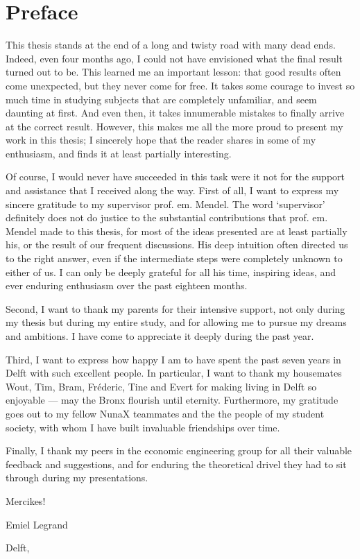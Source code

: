 \chapter{Preface}
\thispagestyle{empty}
This thesis stands at the end of a long and twisty road with many dead ends. Indeed, even four months ago, I could not have envisioned what the final result turned out to be. This learned me an important lesson: that good results often come unexpected, but they never come for free. It takes some courage to invest so much time in studying subjects that are completely unfamiliar, and seem daunting at first. And even then, it takes innumerable mistakes to finally arrive at the correct result. 
However, this makes me all the more proud to present my work in this thesis; I sincerely hope that the reader shares in some of my enthusiasm, and finds it at least partially interesting.

Of course, I would never have succeeded in this task were it not for the support and assistance that I received along the way. First of all, I want to express my sincere gratitude to my supervisor prof. em. Mendel. The word `supervisor' definitely does not do justice to the substantial contributions that prof. em. Mendel made to this thesis, for most of the ideas presented are at least partially his, or the result of our frequent discussions. His deep intuition often directed us to the right answer, even if the intermediate steps were completely unknown to either of us. I can only be deeply grateful for all his time, inspiring ideas, and ever enduring enthusiasm over the past eighteen months. 

Second, I want to thank my parents for their intensive support, not only during my thesis but during my entire study, and for allowing me to pursue my dreams and ambitions. I have come to appreciate it deeply during the past year.

Third, I want to express how happy I am to have spent the past seven years in Delft with such excellent people. In particular, I want to thank my housemates Wout, Tim, Bram, Fréderic, Tine and Evert for making living in Delft so enjoyable --- may the Bronx flourish until eternity. Furthermore, my gratitude goes out to my fellow NunaX teammates and the the people of my student society, with whom I have built invaluable friendships over time.

Finally, I thank my peers in the economic engineering group for all their valuable feedback and suggestions, and for enduring the theoretical drivel they had to sit through during my presentations.

Mercikes!

\begin{flushright}
    Emiel Legrand
\end{flushright}
Delft, \mscdate



